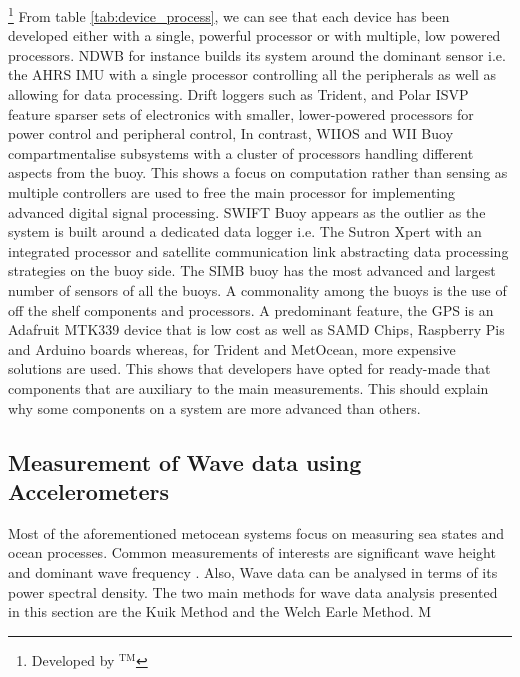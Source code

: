 \footnote[1]{Developed by \textcite{uptempo}$^{\text{TM}}$}
From table \ref{tab:device_process}, we can see that each device has been developed either with a single, powerful processor or with multiple, low powered processors. NDWB for instance builds its system around the dominant sensor i.e. the AHRS IMU with a single processor controlling all the peripherals as well as allowing for data processing. Drift loggers such as Trident, and Polar ISVP feature sparser sets of electronics with smaller, lower-powered processors for power control and peripheral control, In contrast, WIIOS and WII Buoy compartmentalise subsystems with a cluster of processors handling different aspects from the buoy. This shows a focus on computation rather than sensing as multiple controllers are used to free the main processor for implementing advanced digital signal processing. SWIFT Buoy appears as the outlier as the system is built around a dedicated data logger i.e. The Sutron Xpert with an integrated processor and satellite communication link abstracting data processing strategies on the buoy side. The SIMB buoy has the most advanced and largest number of sensors of all the buoys. A commonality among the buoys is the use of off the shelf components and processors. A predominant feature, the GPS is an Adafruit MTK339 device that is low cost as well as SAMD Chips, Raspberry Pis and Arduino boards whereas, for Trident and MetOcean, more expensive solutions are used. This shows that developers have opted for ready-made that components that are auxiliary to the main measurements. This should explain why some components on a system are more advanced than others.



\subsection{Measurement of Wave data using Accelerometers}

Most of the aforementioned metocean systems focus on measuring sea states and ocean processes. Common measurements of interests are significant wave height and dominant wave frequency \cite{williams2013wave}. Also, Wave data can be analysed in terms of its power spectral density. The two main methods for wave data analysis presented in this section are the Kuik Method and the Welch Earle Method. M



